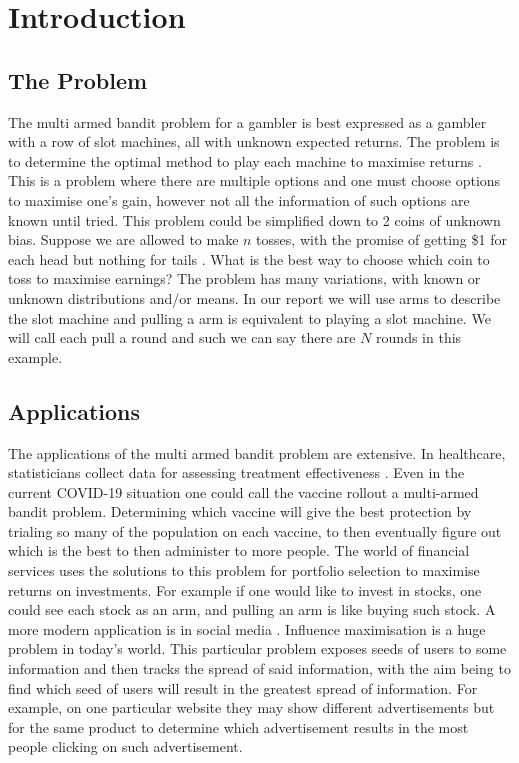 \section{Introduction}\label{sec:introduction}

\subsection{The Problem}\label{subsec:the-problem}
The multi armed bandit problem for a gambler is best expressed as a gambler with a row of slot machines, all with unknown expected returns.
The problem is to determine the optimal method to play each machine to maximise returns \citep{vermorel}.
This is a problem where there are multiple options and one must choose options to maximise one's gain, however not all the information of such options are known until tried.
\newline
\newline
This problem could be simplified down to 2 coins of unknown bias.
Suppose we are allowed to make $n$ tosses, with the promise of getting \$1 for each head but nothing for tails \citep{robbins1952some}.
What is the best way to choose which coin to toss to maximise earnings?
The problem has many variations, with known or unknown distributions and/or means.
\newline
\newline
In our report we will use arms to describe the slot machine and pulling a arm is equivalent to playing a slot machine.
We will call each pull a round and such we can say there are $N$ rounds in this example.

\subsection{Applications}\label{subsec:applications}
The applications of the multi armed bandit problem are extensive.
In healthcare, statisticians collect data for assessing treatment effectiveness \citep{bouneffouf2019survey}.
Even in the current COVID-19 situation one could call the vaccine rollout a multi-armed bandit problem.
Determining which vaccine will give the best protection by trialing so many of the population on each vaccine, to then eventually figure out which is the best to then administer to more people.
The world of financial services uses the solutions to this problem for portfolio selection to maximise returns on investments.
For example if one would like to invest in stocks, one could see each stock as an arm, and pulling an arm is like buying such stock.
\newline
\newline
A more modern application is in social media \citep{chen2013combinatorial}.
Influence maximisation is a huge problem in today's world.
This particular problem exposes seeds of users to some information and then tracks the spread of said information, with the aim being to find which seed of users will result in the greatest spread of information.
For example, on one particular website they may show different advertisements but for the same product to determine which advertisement results in the most people clicking on such advertisement.

